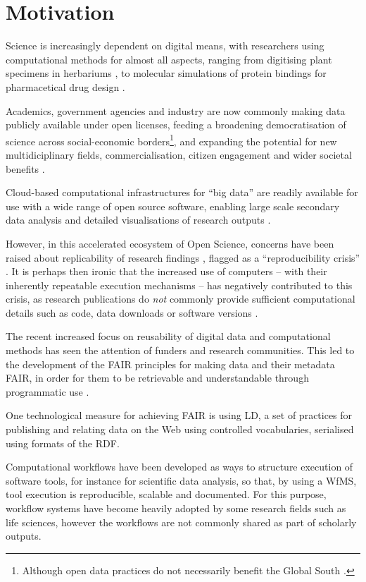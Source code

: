 \section{Motivation}

Science is increasingly dependent on digital means, with researchers using computational methods for almost all aspects, ranging from digitising plant specimens in herbariums \cite{Thiers 2016}, to molecular simulations of protein bindings for pharmacetical drug design \cite{Sledz 2018}. 

Academics, government agencies and industry are now commonly making data publicly available under open licenses, feeding a broadening democratisation of science \cite{Kitchin 2021} across social-economic borders\footnote{Although open data practices do not necessarily benefit the Global South \cite{Serwadda 2018}.}, and expanding the potential for new multidiciplinary fields, commercialisation, citizen engagement and wider societal benefits \cite{Bisol 2014}.

Cloud-based computational infrastructures for ``big data'' are readily available for use with a wide range of open source software, enabling large scale secondary data analysis and detailed visualisations of research outputs \cite{Hashem 2015}.

However, in this accelerated ecosystem of Open Science, concerns have been raised about replicability of research findings \cite{Ioannidis 2005}, flagged as a ``reproducibility crisis'' \cite{Baker 2016}. It is perhaps then ironic that the increased use of computers -- with their inherently repeatable execution mechanisms -- has negatively contributed to this crisis, as research publications do \emph{not} commonly provide sufficient computational details such as code, data downloads or software versions \cite{Stodden 2016}.

The recent increased focus on reusability of digital data and computational methods has seen the attention of funders and research communities. This led to the development of the \acrshort{FAIR} principles for making data and their metadata \acrlong{FAIR}, in order for them to be retrievable and understandable through programmatic use \cite{Wilkinson 2016}.

One technological measure for achieving FAIR is using \acrlong{LD}, a set of practices for publishing and relating data on the Web using controlled vocabularies, serialised using formats of the \acrfull{RDF}. 

Computational \glspl{workflow} have been developed as ways to structure execution of software tools, for instance for scientific data analysis, so that, by using a \gls{WfMS}, tool execution is reproducible, scalable and documented. For this purpose, workflow systems have become heavily adopted by some research fields such as life sciences, however the workflows are not commonly shared as part of scholarly outputs.

